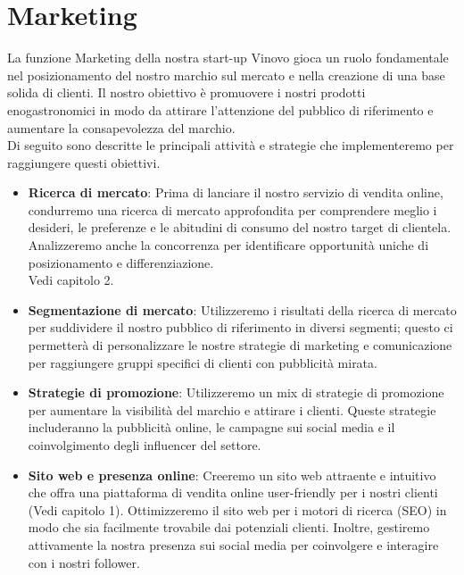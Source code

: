 \documentclass[12pt, a4paper]{article}
\begin{document}
\section{Marketing}
La funzione Marketing della nostra start-up Vinovo gioca un ruolo fondamentale nel posizionamento del nostro marchio sul mercato e nella creazione di una base solida di clienti. Il nostro obiettivo è promuovere i nostri prodotti enogastronomici in modo da attirare l'attenzione del pubblico di riferimento e aumentare la consapevolezza del marchio.\\
Di seguito sono descritte le principali attività e strategie che implementeremo per raggiungere questi obiettivi.
\begin{itemize}
    \item \textbf{Ricerca di mercato}: Prima di lanciare il nostro servizio di vendita online, condurremo una ricerca di mercato approfondita per comprendere meglio i desideri, le preferenze e le abitudini di consumo del nostro target di clientela. Analizzeremo anche la concorrenza per identificare opportunità uniche di posizionamento e differenziazione.\\ Vedi capitolo 2.
    \item \textbf{Segmentazione di mercato}: Utilizzeremo i risultati della ricerca di mercato per suddividere il nostro pubblico di riferimento in diversi segmenti; questo ci permetterà di personalizzare le nostre strategie di marketing e comunicazione per raggiungere gruppi specifici di clienti con pubblicità mirata.
    \item \textbf{Strategie di promozione}: Utilizzeremo un mix di strategie di promozione per aumentare la visibilità del marchio e attirare i clienti. Queste strategie includeranno la pubblicità online, le campagne sui social media e il coinvolgimento degli influencer del settore.
    \item \textbf{Sito web e presenza online}: Creeremo un sito web attraente e intuitivo che offra una piattaforma di vendita online user-friendly per i nostri clienti (Vedi capitolo 1). Ottimizzeremo il sito web per i motori di ricerca (SEO) in modo che sia facilmente trovabile dai potenziali clienti. Inoltre, gestiremo attivamente la nostra presenza sui social media per coinvolgere e interagire con i nostri follower.

\end{itemize}
\end{document}
